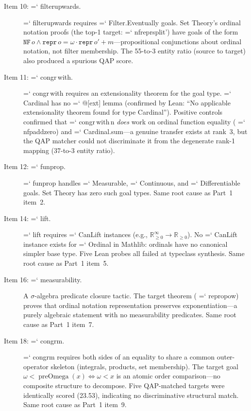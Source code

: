 \documentclass[11pt]{article}
\renewcommand{\texttt}[1]{%
  \begingroup\ttfamily\hyphenchar\font=`\-\relax
  \def\_{\textunderscore\discretionary{}{}{}}%
  #1\endgroup}
\theoremstyle{definition}
\theoremstyle{remark}
\begin{document}
\begin{description}
\item[Item 10: \texttt{filter\_upwards}.]
  \texttt{filter\_upwards} requires \texttt{Filter.Eventually} goals.
  Set Theory's ordinal notation proofs (the top-1 target:
  \texttt{nf\_repr\_split'}) have goals of the form $\mathtt{NF}\,o
  \wedge \mathtt{repr}\,o = \omega \cdot \mathtt{repr}\,o' + m$---propositional
  conjunctions about ordinal notation, not filter membership.
  The 55-to-3 entity ratio (source to target) also produced a
  spurious QAP score.

\item[Item 11: \texttt{congr\,with}.]
  \texttt{congr\,with} requires an extensionality theorem for the
  goal type.  \texttt{Cardinal} has no \texttt{@[ext]} lemma
  (confirmed by Lean: ``No applicable extensionality theorem found
  for type Cardinal'').  Positive controls confirmed that
  \texttt{congr\,with\,n} \emph{does} work on ordinal function
  equality (\texttt{nfp\_add\_zero}) and \texttt{Cardinal.sum}---a
  genuine transfer exists at rank~3, but the QAP matcher could not
  discriminate it from the degenerate rank-1 mapping (37-to-3 entity
  ratio).

\item[Item 12: \texttt{fun\_prop}.]
  \texttt{fun\_prop} handles \texttt{Measurable}, \texttt{Continuous},
  and \texttt{Differentiable} goals.  Set Theory has zero such
  goal types.  Same root cause as Part~1 item~2.

\item[Item 14: \texttt{lift}.]
  \texttt{lift} requires \texttt{CanLift} instances (e.g.,
  $\mathbb{R}_{\geq 0}^\infty \to \mathbb{R}_{\geq 0}$).  No
  \texttt{CanLift} instance exists for \texttt{Ordinal} in Mathlib:
  ordinals have no canonical simpler base type.  Five Lean probes
  all failed at typeclass synthesis.  Same root cause as Part~1
  item~5.

\item[Item 16: \texttt{measurability}.]
  A $\sigma$-algebra predicate closure tactic.  The target theorem
  (\texttt{repr\_opow}) proves that ordinal notation representation
  preserves exponentiation---a purely algebraic statement with no
  measurability predicates.  Same root cause as Part~1 item~7.

\item[Item 18: \texttt{congrm}.]
  \texttt{congrm} requires both sides of an equality to share a
  common outer-operator skeleton (integrals, products, set
  membership).  The target goal
  $\omega < \operatorname{preOmega}(x) \Leftrightarrow \omega < x$
  is an atomic order comparison---no composite structure to
  decompose.  Five QAP-matched targets were identically scored
  (23.53), indicating no discriminative structural match.
  Same root cause as Part~1 item~9.
\end{description}
\end{document}
